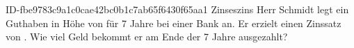 \begin{exercise}
      {ID-fbe9783c9a1c0cae42bc0b1c7ab65f6430f65aa1}
      {Zinseszins}
  \ifproblem\problem
    Herr Schmidt legt ein Guthaben in Höhe von  für \num{7} Jahre bei
    einer Bank an. Er erzielt einen Zinssatz von . Wie viel Geld
    bekommt er am Ende der \num{7} Jahre ausgezahlt?
  \fi
\end{exercise}
